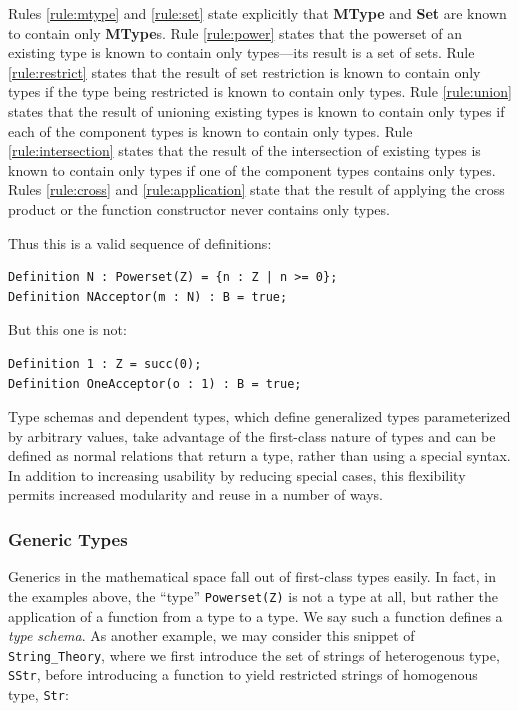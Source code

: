 Rules \ref{rule:mtype} and \ref{rule:set} state explicitly that \textbf{MType} and \textbf{Set} are known to contain only \textbf{MType}s.  Rule \ref{rule:power} states that the powerset of an existing type is known to contain only types---its result is a set of sets.  Rule \ref{rule:restrict} states that the result of set restriction is known to contain only types if the type being restricted is known to contain only types.  Rule \ref{rule:union} states that the result of unioning existing types is known to contain only types if each of the component types is known to contain only types.  Rule \ref{rule:intersection} states that the result of the intersection of existing types is known to contain only types if one of the component types contains only types.  Rules \ref{rule:cross} and \ref{rule:application} state that the result of applying the cross product or the function constructor never contains only types.

Thus this is a valid sequence of definitions:

\begin{lstlisting}
Definition N : Powerset(Z) = {n : Z | n >= 0};
Definition NAcceptor(m : N) : B = true;
\end{lstlisting}

But this one is not:

\begin{lstlisting}
Definition 1 : Z = succ(0);
Definition OneAcceptor(o : 1) : B = true;
\end{lstlisting}

Type schemas and dependent types, which define generalized types parameterized by arbitrary values, take advantage of the first-class nature of types and can be defined as normal relations that return a type, rather than using a special syntax.  In addition to increasing usability by reducing special cases, this flexibility permits increased modularity and reuse in a number of ways.

		\subsubsection{Generic Types\label{genericTypes}}

Generics in the mathematical space fall out of first-class types easily.  In fact, in the examples above, the ``type'' \texttt{Powerset(Z)} is not a type at all, but rather the application of a function from a type to a type.  We say such a function defines a \emph{type schema}.  As another example, we may consider this snippet of \texttt{String\_Theory}, where we first introduce the set of strings of heterogenous type, \texttt{SStr}, before introducing a function to yield restricted strings of homogenous type, \texttt{Str}:

